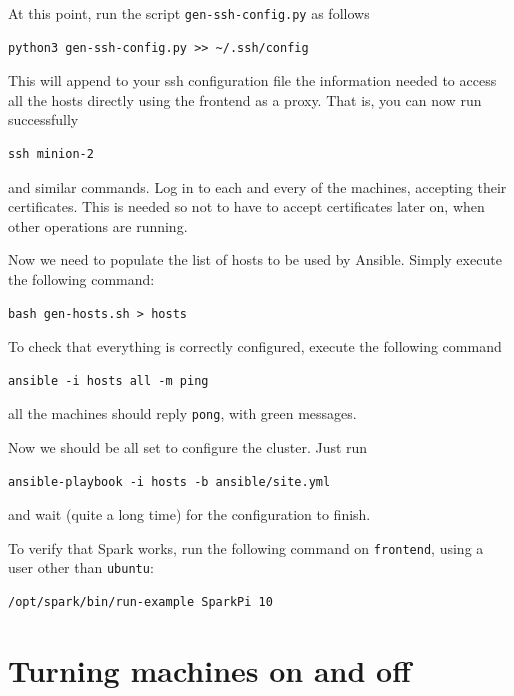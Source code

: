 \documentclass[justified]{tufte-handout}
\begin{document}
At this point, run the script \texttt{gen-ssh-config.py} as follows

\begin{verbatim}
python3 gen-ssh-config.py >> ~/.ssh/config
\end{verbatim}

\noindent
This will append to your ssh configuration file the information needed
to access all the hosts directly using the frontend as a proxy. That is,
you can now run successfully

\begin{verbatim}
ssh minion-2
\end{verbatim}

\noindent and similar commands. Log in to each and every of the
machines, accepting their certificates. This is needed so not to have to
accept certificates later on, when other operations are running.

\vspace{1em} Now we need to populate the list of hosts to be used by
Ansible. Simply execute the following command:

\begin{verbatim}
bash gen-hosts.sh > hosts
\end{verbatim}

To check that everything is correctly configured, execute the following
command

\begin{verbatim}
ansible -i hosts all -m ping
\end{verbatim}

\noindent
all the machines should reply \texttt{pong}, with green messages.

Now we should be all set to configure the cluster. Just run

\begin{verbatim}
ansible-playbook -i hosts -b ansible/site.yml
\end{verbatim}

and wait (quite a long time) for the configuration to finish.

\vspace{2em}

To verify that Spark works, run the following command on
\texttt{frontend}, using a user other than \texttt{ubuntu}:

\begin{verbatim}
/opt/spark/bin/run-example SparkPi 10
\end{verbatim}

\section{Turning machines on and off}\label{turning-machines-on-and-off}
\end{document}

